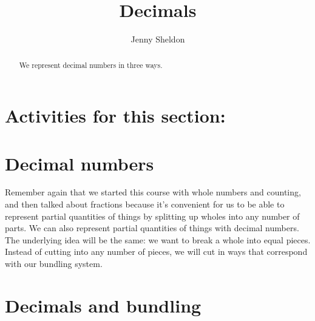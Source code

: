 \documentclass{ximera}
\title{Decimals}
\author{Jenny Sheldon}
\begin{document}
\begin{abstract}
We represent decimal numbers in three ways.
\end{abstract}
\maketitle

\section{Activities for this section:} 

\section{Decimal numbers}

Remember again that we started this course with whole numbers and counting, and then talked about fractions because it's convenient for us to be able to represent partial quantities of things by splitting up wholes into any number of parts. We can also represent partial quantities of things with decimal numbers. The underlying idea will be the same: we want to break a whole  into equal pieces. Instead of cutting into any number of pieces, we will cut in ways that correspond with our bundling system.



\section{Decimals and bundling}
\end{document}
